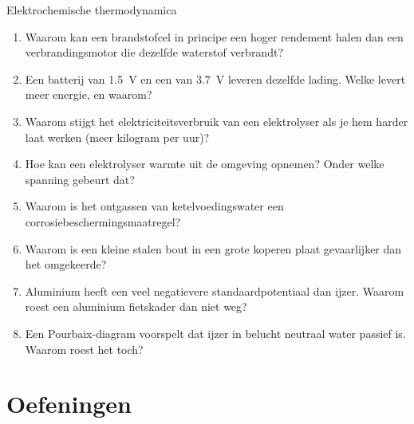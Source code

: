 \begin{reflectie}{Elektrochemische thermodynamica}
\begin{enumerate}
\item Waarom kan een brandstofcel in principe een hoger rendement halen dan een verbrandingsmotor die dezelfde waterstof verbrandt?
\item Een batterij van \SI{1.5}{\volt} en een van \SI{3.7}{\volt} leveren dezelfde lading. Welke levert meer energie, en waarom?
\item Waarom stijgt het elektriciteitsverbruik van een elektrolyser als je hem harder laat werken (meer kilogram per uur)?
\item Hoe kan een elektrolyser warmte uit de omgeving opnemen? Onder welke spanning gebeurt dat?
\item Waarom is het ontgassen van ketelvoedingswater een corrosiebeschermingsmaatregel?
\item Waarom is een kleine stalen bout in een grote koperen plaat gevaarlijker dan het omgekeerde?
\item Aluminium heeft een veel negatievere standaardpotentiaal dan ijzer. Waarom roest een aluminium fietskader dan niet weg?
\item Een Pourbaix-diagram voorspelt dat ijzer in belucht neutraal water passief is. Waarom roest het toch?
\end{enumerate}
\end{reflectie}

\newpage
\section{Oefeningen}


